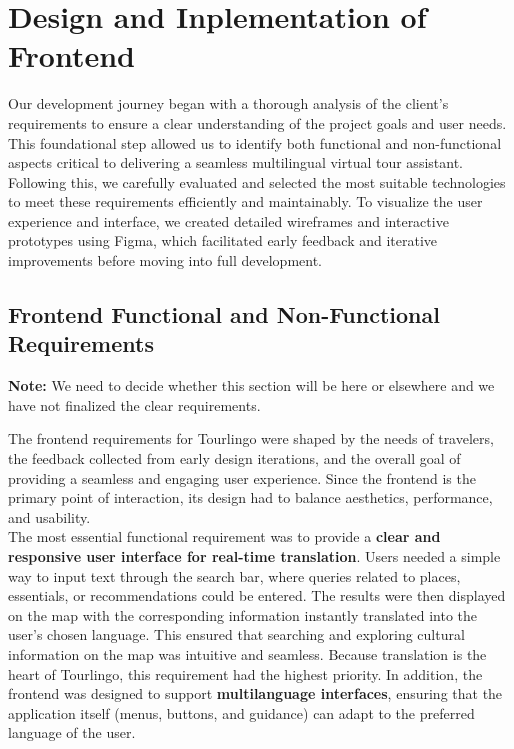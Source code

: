 \section{Design and Inplementation of Frontend}

Our development journey began with a thorough analysis of the client’s requirements to ensure a clear understanding of the project goals and user needs. This foundational step allowed us to identify both functional and non-functional aspects critical to delivering a seamless multilingual virtual tour assistant. Following this, we carefully evaluated and selected the most suitable technologies to meet these requirements efficiently and maintainably. To visualize the user experience and interface, we created detailed wireframes and interactive prototypes using Figma, which facilitated early feedback and iterative improvements before moving into full development.

\subsection{Frontend Functional and Non-Functional Requirements}

\textbf{Note:} We need to decide whether this section will be here or elsewhere and we have not finalized the clear requirements.

The frontend requirements for Tourlingo were shaped by the needs of travelers, the feedback collected from early design iterations, and the overall goal of providing a seamless and engaging user experience. Since the frontend is the primary point of interaction, its design had to balance aesthetics, performance, and usability. \\ 

The most essential functional requirement was to provide a \textbf{clear and responsive user interface for real-time translation}. Users needed a simple way to input text through the search bar, where queries related to places, essentials, or recommendations could be entered. The results were then displayed on the map with the corresponding information instantly translated into the user’s chosen language. This ensured that searching and exploring cultural information on the map was intuitive and seamless. Because translation is the heart of Tourlingo, this requirement had the highest priority. In addition, the frontend was designed to support \textbf{multilanguage interfaces}, ensuring that the application itself (menus, buttons, and guidance) can adapt to the preferred language of the user.  \\

